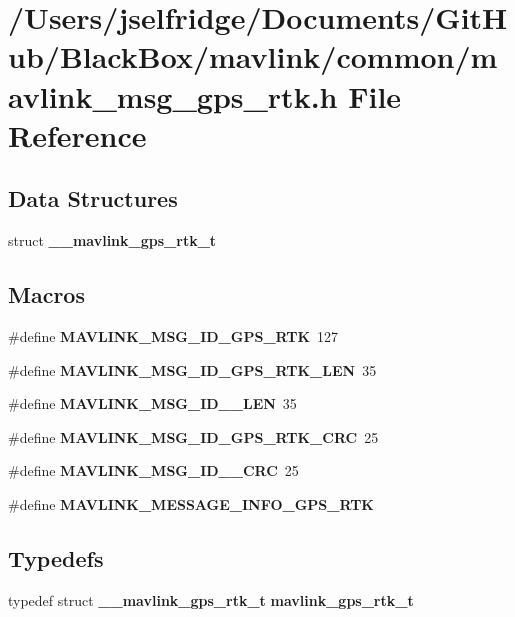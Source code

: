 \section{/\+Users/jselfridge/\+Documents/\+Git\+Hub/\+Black\+Box/mavlink/common/mavlink\+\_\+msg\+\_\+gps\+\_\+rtk.h File Reference}
\label{mavlink__msg__gps__rtk_8h}
\subsection*{Data Structures}
\begin{DoxyCompactItemize}
\item 
struct \textbf{ \+\_\+\+\_\+mavlink\+\_\+gps\+\_\+rtk\+\_\+t}
\end{DoxyCompactItemize}
\subsection*{Macros}
\begin{DoxyCompactItemize}
\item 
\#define \textbf{ M\+A\+V\+L\+I\+N\+K\+\_\+\+M\+S\+G\+\_\+\+I\+D\+\_\+\+G\+P\+S\+\_\+\+R\+TK}~127
\item 
\#define \textbf{ M\+A\+V\+L\+I\+N\+K\+\_\+\+M\+S\+G\+\_\+\+I\+D\+\_\+\+G\+P\+S\+\_\+\+R\+T\+K\+\_\+\+L\+EN}~35
\item 
\#define \textbf{ M\+A\+V\+L\+I\+N\+K\+\_\+\+M\+S\+G\+\_\+\+I\+D\+\_\+\_\+\+L\+EN}~35
\item 
\#define \textbf{ M\+A\+V\+L\+I\+N\+K\+\_\+\+M\+S\+G\+\_\+\+I\+D\+\_\+\+G\+P\+S\+\_\+\+R\+T\+K\+\_\+\+C\+RC}~25
\item 
\#define \textbf{ M\+A\+V\+L\+I\+N\+K\+\_\+\+M\+S\+G\+\_\+\+I\+D\+\_\+\_\+\+C\+RC}~25
\item 
\#define \textbf{ M\+A\+V\+L\+I\+N\+K\+\_\+\+M\+E\+S\+S\+A\+G\+E\+\_\+\+I\+N\+F\+O\+\_\+\+G\+P\+S\+\_\+\+R\+TK}
\end{DoxyCompactItemize}
\subsection*{Typedefs}
\begin{DoxyCompactItemize}
\item 
typedef struct \textbf{ \+\_\+\+\_\+mavlink\+\_\+gps\+\_\+rtk\+\_\+t} \textbf{ mavlink\+\_\+gps\+\_\+rtk\+\_\+t}
\end{DoxyCompactItemize}


